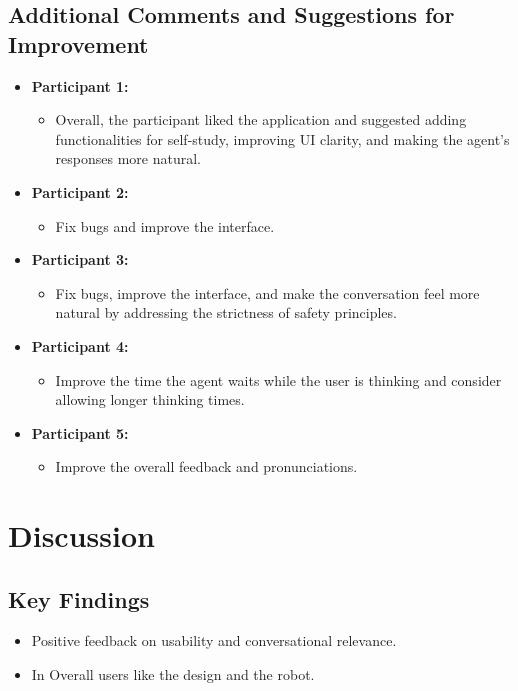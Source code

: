 \documentclass{article}
\begin{document}
\subsection{Additional Comments and Suggestions for Improvement}
\begin{itemize}
    \item \textbf{Participant 1:}
    \begin{itemize}
        \item Overall, the participant liked the application and suggested adding functionalities for self-study, improving UI clarity, and making the agent's responses more natural.
    \end{itemize}
    \item \textbf{Participant 2:}
    \begin{itemize}
        \item Fix bugs and improve the interface.
    \end{itemize}
    \item \textbf{Participant 3:}
    \begin{itemize}
        \item Fix bugs, improve the interface, and make the conversation feel more natural by addressing the strictness of safety principles.
    \end{itemize}
    \item \textbf{Participant 4:}
    \begin{itemize}
        \item Improve the time the agent waits while the user is thinking and consider allowing longer thinking times.
    \end{itemize}
        \item \textbf{Participant 5:}
    \begin{itemize}
        \item Improve the overall feedback and pronunciations.
    \end{itemize}
\end{itemize}

\section{Discussion}

\subsection{Key Findings}
\begin{itemize}
    \item Positive feedback on usability and conversational relevance.
    \item In Overall users like the design and the robot.
\end{itemize}
\end{document}
